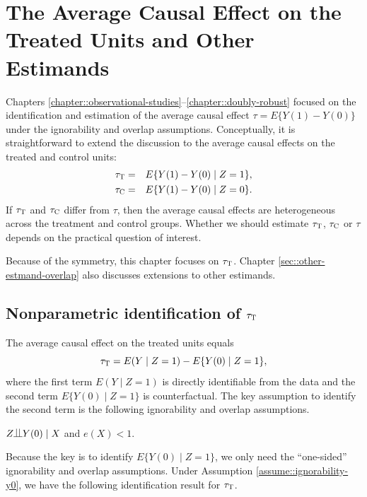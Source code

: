 
\chapter{The Average Causal Effect on the Treated Units and Other Estimands}
 \label{chapter::ATT-and-other}

Chapters \ref{chapter::observational-studies}--\ref{chapter::doubly-robust} focused on the identification and estimation of the average causal effect $\tau = E\{  Y(1) - Y(0) \}$ under the ignorability and overlap assumptions. Conceptually, it is straightforward to extend the discussion to the average causal effects on the treated and control units:
\begin{eqnarray*}
\tau_\textsc{T}  &=&  E\{  Y(1) - Y(0) \mid Z=1 \} ,  \\
\tau_\textsc{C}  &=&  E\{  Y(1) - Y(0) \mid Z=0 \} . 
\end{eqnarray*}
If $\tau_\textsc{T}$ and $\tau_\textsc{C}$ differ from $\tau$, then the average causal effects are heterogeneous across the treatment and control groups. Whether we should estimate $\tau_\textsc{T}$, $\tau_\textsc{C}$ or $\tau$ depends on the practical question of interest. 


Because of the symmetry, this chapter focuses on $\tau_\textsc{T} $. Chapter \ref{sec::other-estmand-overlap} also discusses extensions to other estimands. 



\section{Nonparametric identification of $\tau_\textsc{T} $ }


The average causal effect on the treated units equals 
$$
\tau_\textsc{T} = E(Y\mid Z=1) -  E\{    Y(0) \mid Z=1 \},
$$
where the first term $E(Y\mid Z=1) $ is directly identifiable from the data and the second term $E\{    Y(0) \mid Z=1 \}$ is counterfactual. The key assumption to identify the second term is the following ignorability and overlap assumptions.



\begin{assumption}
\label{assume::ignorability-y0}
$Z\ind Y(0) \mid X$ and $e(X) < 1$. 
\end{assumption}

Because the key is to identify $E\{    Y(0) \mid Z=1 \}$, we only need the ``one-sided'' ignorability and overlap assumptions. Under Assumption \ref{assume::ignorability-y0}, we have the following identification result for $\tau_\textsc{T} $. 


